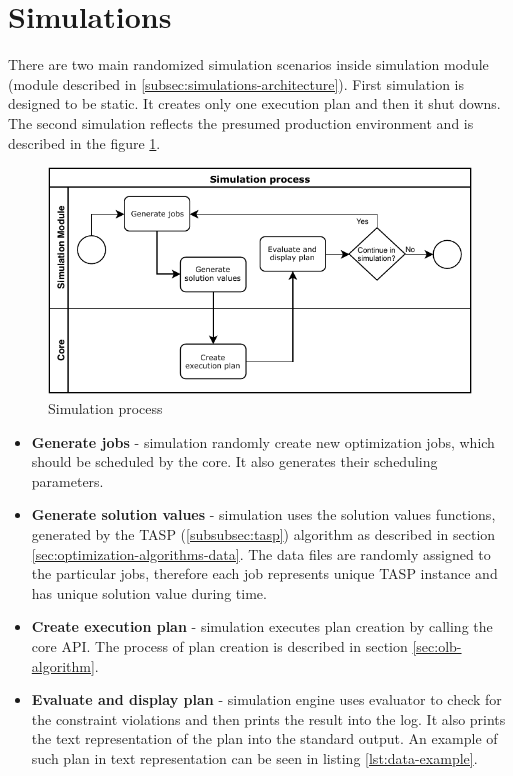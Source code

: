 \section{Simulations}\label{sec:simulations}

There are two main randomized simulation scenarios inside simulation module 
(module described in \ref{subsec:simulations-architecture}).
First simulation is designed to be static.
It creates only one execution plan
and then it shut downs.
The second simulation reflects the presumed production environment
and is described in the figure \ref{fig:simulation-process}.

\begin{figure}[ht] 
	\includegraphics[width=\textwidth]{i_simulation_process.pdf} 
	\centering
	\caption{Simulation process}
	\label{fig:simulation-process}
\end{figure}

\begin{itemize}
  \item \textbf{Generate jobs} - simulation randomly create new optimization jobs, 
  which should be scheduled by the core.
  It also generates their scheduling parameters.
  \item \textbf{Generate solution values} - simulation uses the solution values functions,
  generated by the TASP (\ref{subsubsec:tasp}) algorithm as described in section \ref{sec:optimization-algorithms-data}.
  The data files are randomly assigned to the particular jobs, 
  therefore each job represents unique TASP instance
  and has unique solution value during time.
  \item \textbf{Create execution plan} - simulation executes plan creation by calling the core API.
  The process of plan creation is described in section \ref{sec:olb-algorithm}.
  \item \textbf{Evaluate and display plan} - simulation engine uses evaluator to check for the constraint violations
  and then prints the result into the log.
  It also prints the text representation of the plan into the standard output. 
  An example of such plan in text representation can be seen in listing \ref{lst:data-example}.
\end{itemize}

